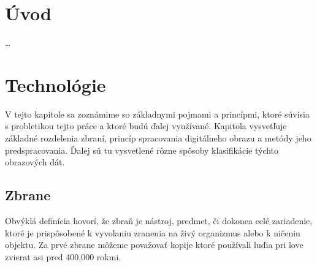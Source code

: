 
\chapter{Úvod}
\dots

\chapter{Technológie}
\label{chap:technologie}
V tejto kapitole sa zoznámime so základnymi pojmami a princípmi, ktoré súvisia s probletikou tejto práce a ktoré budú ďalej využívané.
Kapitola vysvetľuje základné rozdelenia zbraní, princíp spracovania digitálneho obrazu a metódy jeho predspracovania.
Ďalej sú tu vysvetlené rôzne spôsoby klasifikácie týchto obrazových dát.


\section{Zbrane}
Obvýklá definícia hovorí, že zbraň je nástroj, predmet, či dokonca celé zariadenie,
ktoré je prispôsobené k vyvolaniu zranenia na živý organizmus alebo k ničeniu objektu\cite{book:StrelneZbrane}.
Za prvé zbrane môžeme považovať kopije ktoré používali luďia pri love zvierat asi pred 400,000 rokmi\cite{prop:SpearHistory}.

